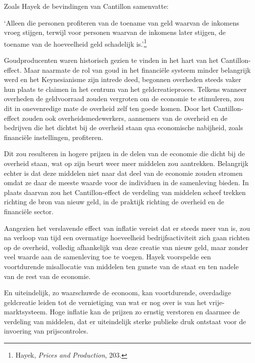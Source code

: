 \documentclass[
  a5paper,
  smalldemyvopaper,11pt,twoside,onecolumn,openright,extrafontsizes,
hidelinks]{memoir}
\renewenvironment{quote}%
               {\list{}{\rightmargin=.3cm\leftmargin=.3cm}%
                \itshape \item[]}%
               {\endlist}
\begin{document}
Zoals Hayek de bevindingen van Cantillon samenvatte:

\begin{quote}
`Alleen die personen profiteren van de toename van geld waarvan de
inkomens vroeg stijgen, terwijl voor personen waarvan de inkomens later
stijgen, de toename van de hoeveelheid geld schadelijk is.'\footnote{\hspace{0pt}Hayek,
  \emph{Prices and Production}, 203.}
\end{quote}

Goudproducenten waren historisch gezien te vinden in het hart van het
Cantillon-effect. Maar naarmate de rol van goud in het financiële
systeem minder belangrijk werd en het Keynesianisme zijn intrede deed,
begonnen overheden steeds vaker hun plaats te claimen in het centrum van
het geldcreatieproces. Telkens wanneer overheden de geldvoorraad zouden
vergroten om de economie te stimuleren, zou dit in onevenredige mate de
overheid zelf ten goede komen. Door het Cantillon-effect zouden ook
overheidsmedewerkers, aannemers van de overheid en de bedrijven die het
dichtst bij de overheid staan qua economische nabijheid, zoals
financiële instellingen, profiteren.

Dit zou resulteren in hogere prijzen in de delen van de economie die
dicht bij de overheid staan, wat op zijn beurt weer meer middelen zou
aantrekken. Belangrijk echter is dat deze middelen niet naar dat deel
van de economie zouden stromen omdat ze daar de meeste waarde voor de
individuen in de samenleving bieden. In plaats daarvan zou het
Cantillon-effect de verdeling van middelen scheef trekken richting de
bron van nieuw geld, in de praktijk richting de overheid en de
financiële sector.

Aangezien het verslavende effect van inflatie vereist dat er steeds meer
van is, zou na verloop van tijd een overmatige hoeveelheid
bedrijfsactiviteit zich gaan richten op de overheid, volledig
afhankelijk van deze creatie van nieuw geld, maar zonder veel waarde aan
de samenleving toe te voegen. Hayek voorspelde een voortdurende
misallocatie van middelen ten gunste van de staat en ten nadele van de
rest van de economie.

En uiteindelijk, zo waarschuwde de econoom, kan voortdurende, overdadige
geldcreatie leiden tot de vernietiging van wat er nog over is van het
vrije-marktsysteem. Hoge inflatie kan de prijzen zo ernstig verstoren en
daarmee de verdeling van middelen, dat er uiteindelijk sterke publieke
druk ontstaat voor de invoering van prijscontroles.
\end{document}
